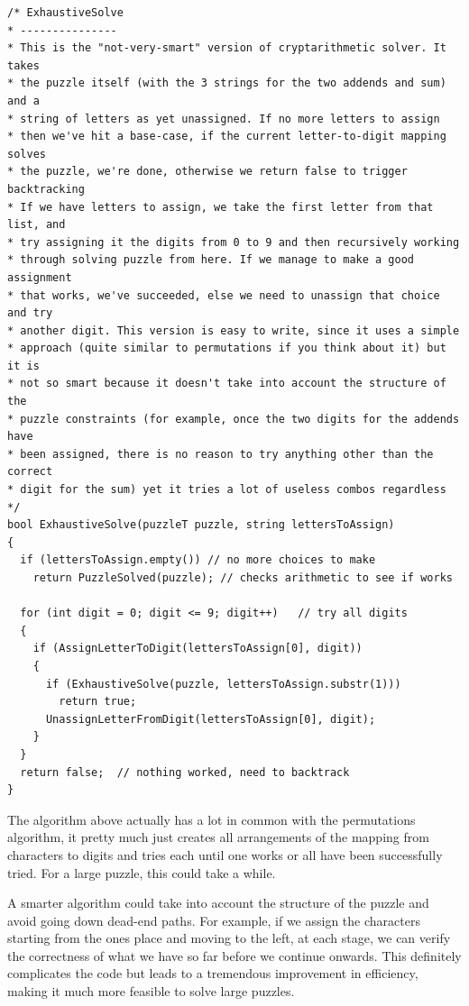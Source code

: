 \begin{lstlisting}[style=raycppnewsnippet]
/* ExhaustiveSolve
* ---------------
* This is the "not-very-smart" version of cryptarithmetic solver. It takes
* the puzzle itself (with the 3 strings for the two addends and sum) and a
* string of letters as yet unassigned. If no more letters to assign
* then we've hit a base-case, if the current letter-to-digit mapping solves
* the puzzle, we're done, otherwise we return false to trigger backtracking
* If we have letters to assign, we take the first letter from that list, and
* try assigning it the digits from 0 to 9 and then recursively working
* through solving puzzle from here. If we manage to make a good assignment
* that works, we've succeeded, else we need to unassign that choice and try
* another digit. This version is easy to write, since it uses a simple
* approach (quite similar to permutations if you think about it) but it is
* not so smart because it doesn't take into account the structure of the
* puzzle constraints (for example, once the two digits for the addends have
* been assigned, there is no reason to try anything other than the correct
* digit for the sum) yet it tries a lot of useless combos regardless
*/
bool ExhaustiveSolve(puzzleT puzzle, string lettersToAssign)
{
  if (lettersToAssign.empty()) // no more choices to make
    return PuzzleSolved(puzzle); // checks arithmetic to see if works

  for (int digit = 0; digit <= 9; digit++)   // try all digits
  {
    if (AssignLetterToDigit(lettersToAssign[0], digit))
    {
      if (ExhaustiveSolve(puzzle, lettersToAssign.substr(1)))
        return true;
      UnassignLetterFromDigit(lettersToAssign[0], digit);
    }
  }
  return false;  // nothing worked, need to backtrack
}
\end{lstlisting}
The algorithm above actually has a lot in common with the permutations
algorithm, it pretty much just creates all arrangements of the mapping from
characters to digits and tries each until one works or all have been
successfully tried. For a large puzzle, this could take a while.

A smarter algorithm could take into account the structure of the puzzle and
avoid going down dead-end paths. For example, if we assign the characters
starting from the ones place and moving to the left, at each stage, we can
verify the correctness of what we have so far before we continue onwards.
This definitely complicates the code but leads to a tremendous improvement
in efficiency, making it much more feasible to solve large puzzles.

